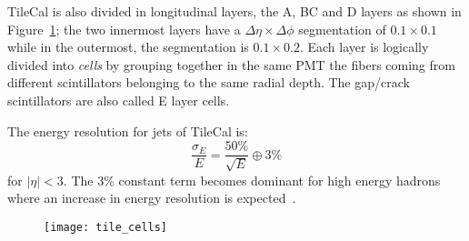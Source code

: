 TileCal is also divided in longitudinal layers, the A, BC and D layers as shown
in Figure~\ref{fig:tile_cells}; the two innermost layers have a
$\Delta \eta \times \Delta \phi$ segmentation of $0.1 \times 0.1$ while in the
outermost, the segmentation is $0.1 \times 0.2$. Each layer is logically divided
into \emph{cells} by grouping together in the same PMT the fibers coming from
different scintillators belonging to the same radial depth. The gap/crack
scintillators are also called E layer cells.

The energy resolution for jets of TileCal is:
\begin{equation}
  \label{eq:65}
  \frac{\sigma_E}{E} = \frac{50\%}{\sqrt{E}} \oplus 3\%
\end{equation}
for $|\eta| < 3$. The 3\% constant term becomes dominant for high energy hadrons
where an increase in energy resolution is expected~\cite{TileCal}.

\begin{figure}[!h]
  \centering
    \texttt{[image: tile\_cells]}
    \caption{}
    \label{fig:tile_cells}
\end{figure}
